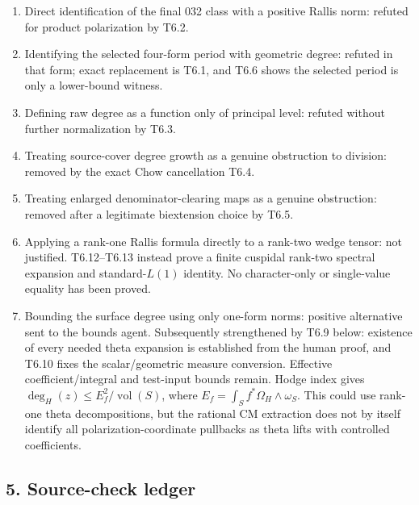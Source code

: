 \documentclass[11pt,a4paper]{article}
\providecommand{\tightlist}{\setlength{\itemsep}{0pt}\setlength{\parskip}{0pt}}
\theoremstyle{definition}
\begin{document}
\begin{enumerate}
\def\labelenumi{\arabic{enumi}.}
\tightlist
\item
  Direct identification of the final 032 class with a positive Rallis norm: refuted for product polarization by T6.2.
\item
  Identifying the selected four-form period with geometric degree: refuted in that form; exact replacement is T6.1, and T6.6 shows the selected period is only a lower-bound witness.
\item
  Defining raw degree as a function only of principal level: refuted without further normalization by T6.3.
\item
  Treating source-cover degree growth as a genuine obstruction to division: removed by the exact Chow cancellation T6.4.
\item
  Treating enlarged denominator-clearing maps as a genuine obstruction: removed after a legitimate biextension choice by T6.5.
\item
  Applying a rank-one Rallis formula directly to a rank-two wedge tensor: not justified. T6.12--T6.13 instead prove a finite cuspidal rank-two spectral expansion and standard-\(L(1)\) identity. No character-only or single-value equality has been proved.
\item
  Bounding the surface degree using only one-form norms: positive alternative sent to the bounds agent. Subsequently strengthened by T6.9 below: existence of every needed theta expansion is established from the human proof, and T6.10 fixes the scalar/geometric measure conversion. Effective coefficient/integral and test-input bounds remain. Hodge index gives \(\deg_H(z)\le E_f^2/\operatorname{vol}(S)\), where \(E_f=\int_Sf^*\Omega_H\wedge\omega_S\). This could use rank-one theta decompositions, but the rational CM extraction does not by itself identify all polarization-coordinate pullbacks as theta lifts with controlled coefficients.
\end{enumerate}

\subsection{5. Source-check ledger}\label{source-check-ledger}
\end{document}
